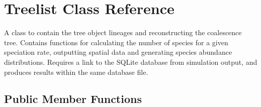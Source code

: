 \hypertarget{class_treelist}{}\section{Treelist Class Reference}
\label{class_treelist}


A class to contain the tree object lineages and reconstructing the coalescence tree. Contains functions for calculating the number of species for a given speciation rate, outputting spatial data and generating species abundance distributions. Requires a link to the S\+Q\+Lite database from simulation output, and produces results within the same database file.  


\subsection*{Public Member Functions}
